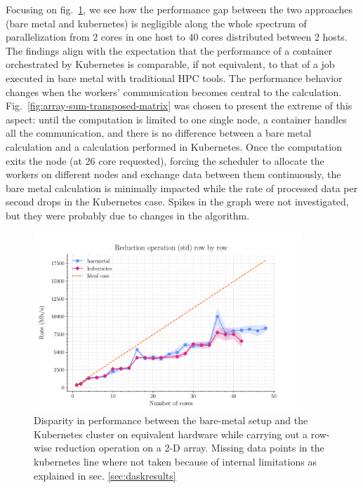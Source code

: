 Focusing on fig.~\ref{fig:array-reduction-std-along-axis}, we see how the
performance gap between the two approaches (bare metal and kubernetes) is
negligible along the whole spectrum of parallelization from 2 cores in one host
to 40 cores distributed between 2 hosts.
The findings align with the expectation that the performance of a container
orchestrated by Kubernetes is comparable, if not equivalent, to that of a job
executed in bare metal with traditional HPC tools.
The performance behavior changes when the workers' communication becomes central
to the calculation.
Fig.~\ref{fig:array-sum-transposed-matrix} was chosen to present the extreme of
this aspect: until the computation is limited to one single node, a container
handles all the communication, and there is no difference between a bare metal
calculation and a calculation performed in Kubernetes.
Once the computation exits the node (at 26 core requested), forcing the
scheduler to allocate the workers on different nodes and exchange data between
them continuously, the bare metal calculation is minimally impacted while the
rate of processed data per second drops in the Kubernetes case.
Spikes in the graph were not investigated, but they were probably due to changes
in the algorithm.

\begin{figure}
  \centering
  \includegraphics[width=0.9\textwidth]{img/chpt4/array-reduction-std-along-axis}
  \caption{Disparity in performance between the bare-metal setup and the
    Kubernetes cluster on equivalent hardware while carrying out a row-wise
    reduction operation on a 2-D array. Missing data points in the kubernetes
    line where not taken because of internal limitations as explained in sec.
    \ref{sec:daskresults}
  }
  \label{fig:array-reduction-std-along-axis}
\end{figure}


